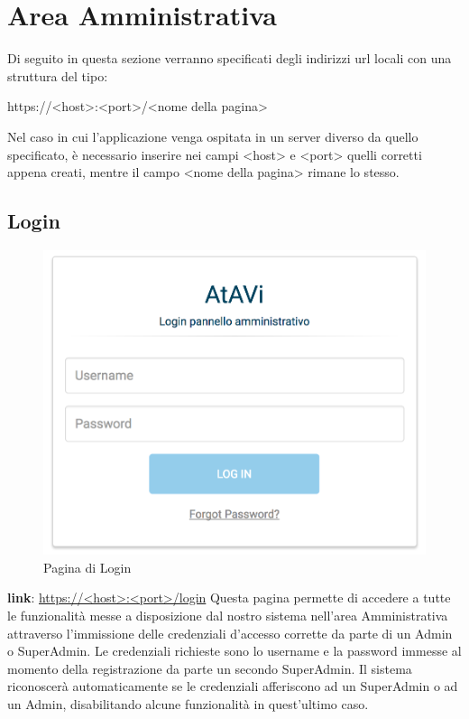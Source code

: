 \documentclass[../ManualeUtente_v2.0.0.tex]{subfiles}
\begin{document}
\section{Area Amministrativa}
    Di seguito in questa sezione verranno specificati degli indirizzi url locali con una struttura del tipo:
    \begin{center}
    https://<host>:<port>/<nome della pagina>
    \end{center}
    Nel caso in cui l'applicazione venga ospitata in un server diverso da quello specificato, è necessario inserire nei campi <host> e <port> quelli corretti appena creati, mentre il campo <nome della pagina> rimane lo stesso.
	\subsection{Login}
	\begin{figure}[!h]
		\centering
		\includegraphics[scale=0.4]{Screenshot/admin-login.png}
		\caption{Pagina di Login}
	\end{figure}
	\textbf{link}: \url{https://<host>:<port>/login}
	\newline
	\newline
	Questa pagina permette di accedere a tutte le funzionalità messe a disposizione dal nostro sistema nell'area Amministrativa attraverso l'immissione delle credenziali d'accesso corrette da parte di un Admin o SuperAdmin. Le credenziali richieste sono lo username e la password immesse al momento della registrazione da parte un secondo SuperAdmin. Il sistema riconoscerà automaticamente se le credenziali afferiscono ad un SuperAdmin o ad un Admin, disabilitando alcune funzionalità in quest'ultimo caso.
	\newpage
\end{document}
